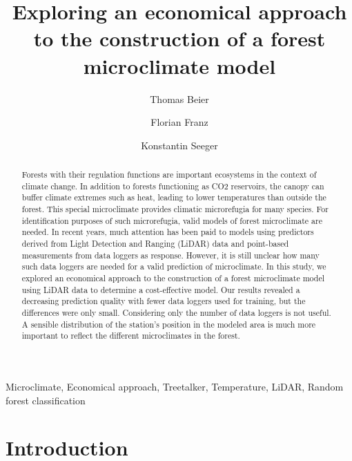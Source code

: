 \documentclass[5p]{elsarticle} %
\begin{document}
\begin{frontmatter}

  \title{Exploring an economical approach to the construction of a forest microclimate model}
    \author[Philipps-University Marburg]{Thomas Beier}
    \author[Philipps-University Marburg]{Florian Franz}
    \author[Philipps-University Marburg]{Konstantin Seeger}
      \address[Philipps-University Marburg]{Philipps-University Marburg,
FB 19 Geography, Deutschhausstraße 10, 35032 Marburg, Germany}
    
  \begin{abstract}
  Forests with their regulation functions are important ecosystems in the context of climate change. In addition to forests functioning as CO2 reservoirs, the canopy can buffer climate extremes such as heat, leading to lower temperatures than outside the forest. This special microclimate provides climatic microrefugia for many species. For identification purposes of such microrefugia, valid models of forest microclimate are needed. In recent years, much attention has been paid to models using predictors derived from Light Detection and Ranging (LiDAR) data and point-based measurements from data loggers as response. However, it is still unclear how many such data loggers are needed for a valid prediction of microclimate. In this study, we explored an economical approach to the construction of a forest microclimate model using LiDAR data to determine a cost-effective model. Our results revealed a decreasing prediction quality with fewer data loggers used for training, but the differences were only small. Considering only the number of data loggers is not useful. A sensible distribution of the station's position in the modeled area is much more important to reflect the different microclimates in the forest.
  \end{abstract}
   \begin{keyword} Microclimate, Economical approach, Treetalker, Temperature, LiDAR, Random forest classification\end{keyword}
 \end{frontmatter}

\newpage

\hypertarget{introduction}{%
\section{Introduction}\label{introduction}}
\end{document}
